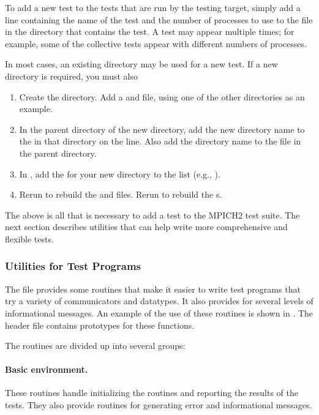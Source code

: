 To add a new test to the tests that are run by the testing target,
simply add a line containing the name of the test and the number of
processes to use to the file  in the directory that
contains the test.  A test may appear multiple times; for example,
some of the collective tests appear with different numbers of
processes.

In most cases, an existing directory may be used for a new test.  If a
new directory is required, you must also 
\begin{enumerate}
\item Create the directory.  Add a  and
 file, using one of the other directories as an
example.
\item In the parent directory of the new directory, add the new
directory name to the  in that directory on the
 line.  Also add the directory name to the
 file in the parent directory.
\item In , add the  for
your new directory to the 
 list (e.g., ).
\item Rerun  to rebuild the 
and  files.  Rerun  to rebuild the
s.  
\end{enumerate}

The above is all that is necessary to add a test to the MPICH2 test
suite.  The next section describes utilities that can help write more
comprehensive and flexible tests.

\subsubsection{Utilities for Test Programs}
The file  provides some routines that make
it easier to write test programs that try a variety of communicators
and datatypes.  It also provides for several levels of informational
messages.  An example of the use of these routines is shown in
.   The header file
 contains prototypes for these functions.

The routines are divided up into several groups:
\paragraph{Basic environment.}
These routines handle initializing the routines and reporting the
results of the tests.  They also provide routines for generating error
and informational messages.  

